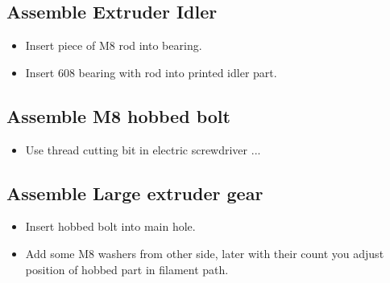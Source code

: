 \documentclass[11pt]{article}
\begin{document}
\subsection{Assemble Extruder Idler}
\begin{itemize}
\item Insert piece of M8 rod into bearing.
\item Insert 608 bearing with rod into printed idler part.
\end{itemize}
\subsection{Assemble M8 hobbed bolt}
\begin{itemize}
\item Use thread cutting bit in electric screwdriver ...
\end{itemize}
\subsection{Assemble Large extruder gear}
\begin{itemize}
\item Insert hobbed bolt into main hole.
\item Add some M8 washers from other side, later with their count you adjust position of hobbed part in filament path.
\end{itemize}
\end{document}
